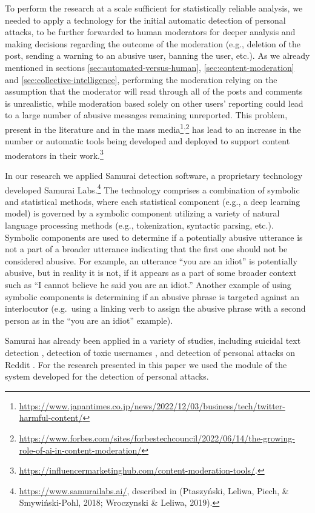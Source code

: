 \documentclass[preprint,12pt]{elsarticle}
\begin{document}
To perform the research at a scale sufficient for statistically reliable analysis, we needed to apply a technology for the initial automatic detection of personal attacks, to be further forwarded to human moderators for deeper analysis and making decisions regarding the outcome of the moderation (e.g., deletion of the post, sending a warning to an abusive user, banning the user, etc.). As we already mentioned in sections \ref{sec:automated-versus-human}, \ref{sec:content-moderation} and \ref{sec:collective-intelligence}, performing the moderation relying on the assumption that the moderator will read through all of the posts and comments is unrealistic, while moderation based solely on  other users' reporting could lead to a large number of abusive messages remaining unreported. This problem, present   in the literature \citep{ptaszynski2018automatic,urbaniak2022personal} and in  the mass media\footnote{\url{https://www.japantimes.co.jp/news/2022/12/03/business/tech/twitter-harmful-content/}}\textsuperscript{,}\footnote{\url{https://www.forbes.com/sites/forbestechcouncil/2022/06/14/the-growing-role-of-ai-in-content-moderation/}} has lead to an increase in the number or automatic tools being developed  and deployed to support content moderators in their work.\footnote{\url{https://influencermarketinghub.com/content-moderation-tools/}.} 

In our research  we applied Samurai detection software, a
proprietary technology developed Samurai Labs.\footnote{\url{https://www.samurailabs.ai/},
  described in (Ptaszyński, Leliwa, Piech, \& Smywiński-Pohl, 2018;
  Wroczynski \& Leliwa, 2019).} The technology comprises a combination
of symbolic and statistical methods, where each statistical component
(e.g., a deep learning model) is governed by a symbolic component
utilizing a variety of natural language processing methods (e.g.,
tokenization, syntactic parsing, etc.). Symbolic components are used to
determine if a potentially abusive utterance is not a part of a broader
utterance indicating that the first one should not be considered
abusive. For example, an utterance ``you are an idiot'' is potentially
abusive, but in reality it is not, if it appears as a part of some broader context
such as ``I cannot believe he said you are an idiot.'' Another
example of using symbolic components is determining if an abusive phrase
is targeted against an interlocutor (e.g.~using a linking verb to assign
the abusive phrase with a second person as in the ``you are an idiot''
example).

Samurai has already been applied in a variety of studies, including suicidal text detection \citep{ijerph182211759}, detection of toxic usernames \citep{URBANIAK2022107371}, and detection of personal attacks on Reddit \citep{urbaniak2022personal}. For the  research presented in this paper we used the module of the system developed for the detection of personal attacks. 
\end{document}
